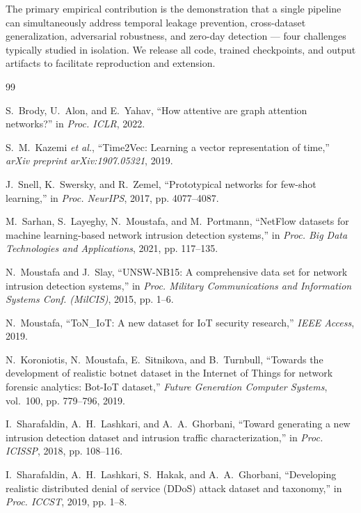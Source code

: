 \documentclass[compsoc,journal]{IEEEtran}
\begin{document}
The primary empirical contribution is the demonstration that a single pipeline can simultaneously address temporal leakage prevention, cross-dataset generalization, adversarial robustness, and zero-day detection — four challenges typically studied in isolation. We release all code, trained checkpoints, and output artifacts to facilitate reproduction and extension.


\begin{thebibliography}{99}

S.~Brody, U.~Alon, and E.~Yahav,
``How attentive are graph attention networks?''
in \emph{Proc. ICLR}, 2022.

S.~M.~Kazemi \emph{et al.},
``Time2Vec: Learning a vector representation of time,''
\emph{arXiv preprint arXiv:1907.05321}, 2019.

J.~Snell, K.~Swersky, and R.~Zemel,
``Prototypical networks for few-shot learning,''
in \emph{Proc. NeurIPS}, 2017, pp. 4077--4087.

M.~Sarhan, S.~Layeghy, N.~Moustafa, and M.~Portmann,
``NetFlow datasets for machine learning-based network intrusion detection systems,''
in \emph{Proc. Big Data Technologies and Applications}, 2021, pp. 117--135.

N.~Moustafa and J.~Slay,
``UNSW-NB15: A comprehensive data set for network intrusion detection systems,''
in \emph{Proc. Military Communications and Information Systems Conf. (MilCIS)}, 2015, pp. 1--6.

N.~Moustafa,
``ToN\_IoT: A new dataset for IoT security research,''
\emph{IEEE Access}, 2019.

N.~Koroniotis, N.~Moustafa, E.~Sitnikova, and B.~Turnbull,
``Towards the development of realistic botnet dataset in the Internet of Things for network forensic analytics: Bot-IoT dataset,''
\emph{Future Generation Computer Systems}, vol.~100, pp. 779--796, 2019.

I.~Sharafaldin, A.~H.~Lashkari, and A.~A.~Ghorbani,
``Toward generating a new intrusion detection dataset and intrusion traffic characterization,''
in \emph{Proc. ICISSP}, 2018, pp. 108--116.

I.~Sharafaldin, A.~H.~Lashkari, S.~Hakak, and A.~A.~Ghorbani,
``Developing realistic distributed denial of service (DDoS) attack dataset and taxonomy,''
in \emph{Proc. ICCST}, 2019, pp. 1--8.


\end{thebibliography}
\end{document}
